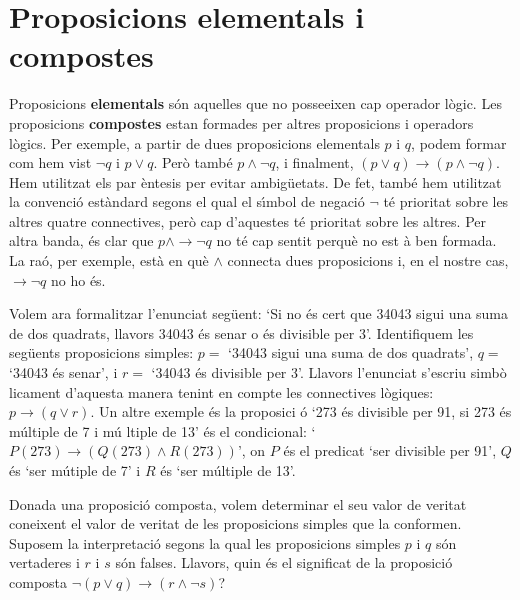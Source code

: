 \section{Proposicions elementals i compostes}

Proposicions \textbf{elementals} s\'{o}n aquelles que no posseeixen cap
operador l\`{o}gic. Les proposicions \textbf{compostes} estan formades per
altres proposicions i operadors l\`{o}gics. Per exemple, a partir de dues
proposicions elementals $p$ i $q$, podem formar com hem vist $\lnot q$ i $%
p\vee q$. Per\`{o} tamb\'{e} $p\wedge\lnot q$, i finalment, $\left( p\vee
q\right) \longrightarrow\left( p\wedge\lnot q\right) $. Hem utilitzat els par%
\`{e}ntesis per evitar ambig\"{u}etats. De fet, tamb\'{e} hem utilitzat la
convenci\'{o} est\`{a}ndard segons el qual el s\'{\i}mbol de negaci\'{o} $%
\lnot$ t\'{e} prioritat sobre les altres quatre connectives, per\`{o} cap
d'aquestes t\'{e} prioritat sobre les altres. Per altra banda, \'{e}s clar
que $p\wedge\longrightarrow\lnot q$ no t\'{e} cap sentit perqu\`{e} no est%
\`{a} ben formada. La ra\'{o}, per exemple, est\`{a} en qu\`{e} $\wedge$
connecta dues proposicions i, en el nostre cas, $\longrightarrow\lnot q$ no
ho \'{e}s.

Volem ara formalitzar l'enunciat seg\"{u}ent: `Si no \'{e}s cert que 34043
sigui una suma de dos quadrats, llavors 34043 \'{e}s senar o \'{e}s
divisible per 3'. Identifiquem les seg\"{u}ents proposicions simples: $p=$
`34043 sigui una suma de dos quadrats', $q=$ `34043 \'{e}s senar', i $r=$
`34043 \'{e}s divisible per 3'. Llavors l'enunciat s'escriu simb\`{o}%
licament d'aquesta manera tenint en compte les connectives l\`{o}giques: $%
p\longrightarrow\left( q\vee r\right) $. Un altre exemple \'{e}s la proposici%
\'{o} `273 \'{e}s divisible per 91, si 273 \'{e}s m\'{u}ltiple de 7 i m\'{u}%
ltiple de 13' \'{e}s el condicional: `$P(273)\longrightarrow\left(
Q(273)\wedge R(273)\right) $', on $P$ \'{e}s el predicat `ser divisible per
91', $Q$ \'{e}s `ser m\'{u}tiple de 7' i $R$ \'{e}s `ser m\'{u}ltiple de 13'.

\bigskip

Donada una proposici\'{o} composta, volem determinar el seu valor de veritat
coneixent el valor de veritat de les proposicions simples que la conformen.
Suposem la interpretaci\'{o} segons la qual les proposicions simples $p$ i $%
q $ s\'{o}n vertaderes i $r$ i $s$ s\'{o}n falses. Llavors, quin \'{e}s el
significat de la proposici\'{o} composta $\lnot\left( p\vee q\right)
\longrightarrow\left( r\wedge\lnot s\right) $?

